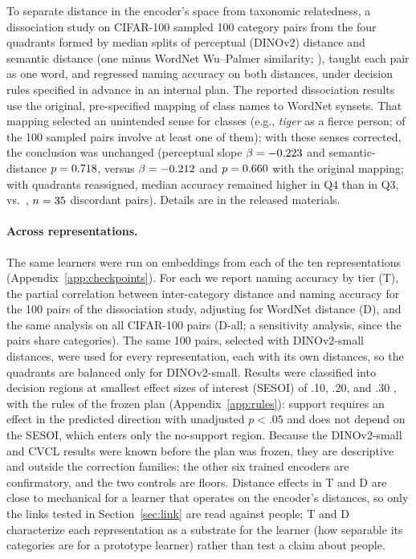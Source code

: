 \documentclass[11pt]{article}
\begin{document}
To separate distance in the encoder's space from taxonomic relatedness, a dissociation study on CIFAR-100 sampled 100 category pairs from the four quadrants formed by median splits of perceptual (DINOv2) distance and semantic distance (one minus WordNet Wu--Palmer similarity; \cite{wu1994,miller1995}), taught each pair as one word, and regressed naming accuracy on both distances, under decision rules specified in advance in an internal plan. The reported dissociation results use the original, pre-specified mapping of class names to WordNet synsets. That mapping selected an unintended sense for \WnNCorrected{} classes (e.g., \emph{tiger} as a fierce person; \WnNTouch{} of the 100 sampled pairs involve at least one of them); with these senses corrected, the conclusion was unchanged (perceptual slope $\beta = -0.223$ and semantic-distance $p = 0.718$, versus $\beta = -0.212$ and $p = 0.660$ with the original mapping; with quadrants reassigned, median accuracy remained higher in Q4 than in Q3, \WnCorrQFour{} vs.\ \WnCorrQThree, $n = 35$ discordant pairs). Details are in the released materials.

\paragraph{Across representations.} The same learners were run on embeddings from each of the ten representations (Appendix~\ref{app:checkpoints}). For each we report naming accuracy by tier (T), the partial correlation between inter-category distance and naming accuracy for the 100 pairs of the dissociation study, adjusting for WordNet distance (D), and the same analysis on all \VtDallN{} CIFAR-100 pairs (D-all; a sensitivity analysis, since the pairs share categories). The same 100 pairs, selected with DINOv2-small distances, were used for every representation, each with its own distances, so the quadrants are balanced only for DINOv2-small. Results were classified into decision regions at smallest effect sizes of interest (SESOI) of .10, .20, and .30 \parencite{schuirmann1987,lakens2017}, with the rules of the frozen plan (Appendix~\ref{app:rules}): support requires an effect in the predicted direction with unadjusted $p < .05$ and does not depend on the SESOI, which enters only the no-support region. Because the DINOv2-small and CVCL results were known before the plan was frozen, they are descriptive and outside the correction families; the other six trained encoders are confirmatory, and the two controls are floors. Distance effects in T and D are close to mechanical for a learner that operates on the encoder's distances, so only the links tested in Section~\ref{sec:link} are read against people; T and D characterize each representation as a substrate for the learner (how separable its categories are for a prototype learner) rather than test a claim about people.
\end{document}
